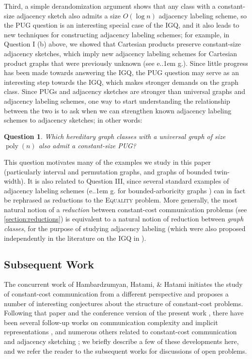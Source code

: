 \documentclass{article}
\makeatletter
\newtheorem{question}[theorem]{Question}
\DeclareMathOperator{\poly}{poly}
\newcommand*\eg{e.\kern.1em g.\@\xspace} %
\makeatother
\begin{document}
Third, a simple derandomization argument shows that any class with a constant-size adjacency sketch
also admits a size $O(\log n)$ adjacency labeling scheme, so the PUG question is an interesting
special case of the IGQ, and it also leads to new techniques for constructing adjacency labeling
schemes; for example, in Question I (b) above, we showed that Cartesian products preserve
constant-size adjacency sketches, which imply new adjacency labeling schemes for Cartesian product
graphs that were previously unknown (see \eg \cite{CLR20}). Since little progress has been made
towards answering the IGQ, the PUG question may serve as an interesting step towards the IGQ, which
makes stronger demands on the graph class.  Since PUGs and adjacency sketches are stronger than
universal graphs and adjacency labeling schemes, one way to start understanding the
relationship between the two is to ask when we can strengthen known adjacency labeling
schemes to adjacency sketches; in other words:
\begin{question}
\label{question:igq-to-pug}
Which hereditary graph classes with a universal graph of size $\poly(n)$ also admit a
constant-size PUG?
\end{question}
This question motivates many of the examples we study in this paper (particularly
interval and permutation graphs, and graphs of bounded twin-width). It is also related to
Question III, since several standard examples of adjacency labeling schemes (\eg for
bounded-arboricity graphs \cite{KNR92}) can in fact be rephrased as reductions to the
\textsc{Equality} problem. More generally, the most natural notion of a \emph{reduction}
between constant-cost communication problems (see \cref{section:reductions}) is equivalent to a natural notion of
reduction between \emph{graph classes}, for the purpose of studying adjacency labeling (which were
also proposed independently in the literature on the IGQ in \cite{Chan23}).


\subsection{Subsequent Work} 
\label{section:discussion}

The concurrent work of Hambardzumyan, Hatami, \& Hatami \cite{HHH23dimfree} initiates the study of
constant-cost communication from a different perspective and proposes a number of interesting
conjectures about the structure of constant-cost problems. Following that paper and the conference
version of the present work \cite{HWZ22}, there have been several follow-up works on communication
complexity and implicit representations \cite{HHH22counter, EHK22, EHZ23, HZ23}, and numerous others
related to constant-cost communication \cite{HHPTZ22,ACHS23,CHHS23,HHM23,FHHH24,FGHH24} and
adjacency sketching \cite{NP24}; we briefly describe a few of these developments here, and we refer
the reader to the subsequent works for discussions of open problems.
\end{document}
